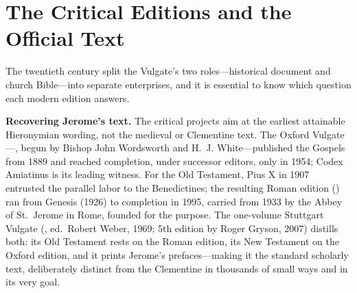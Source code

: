 \section{The Critical Editions and the Official Text}

The twentieth century split the Vulgate's two roles---historical document
and church Bible---into separate enterprises, and it is essential to know
which question each modern edition answers.

\textbf{Recovering Jerome's text.} The critical projects aim at the
earliest attainable Hieronymian wording, not the medieval or Clementine
text. The Oxford Vulgate---, begun by Bishop John Wordsworth and
H.~J. White---published the Gospels from 1889 and reached completion,
under successor editors, only in 1954; Codex Amiatinus is its leading
witness.
For the Old Testament, Pius X in 1907 entrusted the parallel labor to the
Benedictines; the resulting Roman edition () ran from Genesis (1926) to completion in
1995, carried from 1933 by the Abbey of St.~Jerome in Rome, founded for
the purpose. The one-volume Stuttgart
Vulgate (, ed.\ Robert
Weber, 1969; 5th edition by Roger Gryson, 2007) distills both: its Old
Testament rests on the Roman edition, its New Testament on the Oxford
edition, and it prints Jerome's prefaces---making it the standard
scholarly text, deliberately distinct from the Clementine in thousands
of small ways and in its very goal.

